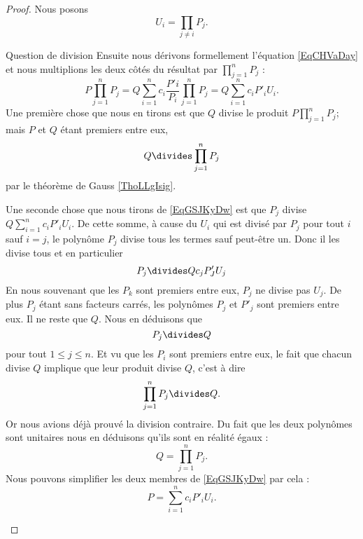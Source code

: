 \begin{proof}
    Nous posons 
    \begin{equation}
        U_i=\prod_{j\neq i}P_j.
    \end{equation}
    \begin{subproof}
    \item[Question de division]
    Ensuite nous dérivons formellement l'équation \eqref{EqCHVaDay} et nous multiplions les deux côtés du résultat par \( \prod_{j=1}^nP_j\) :
    \begin{equation}        \label{EqGSJKyDw}
        P\prod_{j=1}^nP_j=Q\sum_{i=1}^nc_i\frac{ P'i }{ P_i }\prod_{j=1}^nP_j=Q\sum_{i=1}^nc_iP'_iU_i.
    \end{equation}
    Une première chose que nous en tirons est que \( Q\) divise le produit \( P\prod_{j=1}^nP_j\); mais \( P\) et \( Q\) étant premiers entre eux, 
    \begin{equation}
        Q\divides \prod_{j=1}^nP_j
    \end{equation}
    par le théorème de Gauss \ref{ThoLLgIsig}.

    Une seconde chose que nous tirons de \eqref{EqGSJKyDw} est que \( P_j\) divise \( Q\sum_{i=1}^nc_iP'_iU_i\). De cette somme, à cause du \( U_i\) qui est divisé par \( P_j\) pour tout \( i\) sauf \( i=j\), le polynôme \( P_j\) divise tous les termes sauf peut-être un. Donc il les divise tous et en particulier
    \begin{equation}
        P_j\divides Qc_jP'_JU_j
    \end{equation}
    En nous souvenant que les \( P_k\) sont premiers entre eux, \( P_j\) ne divise pas \( U_j\). De plus \( P_j\) étant sans facteurs carrés, les polynômes \( P_j\) et \( P'_j\) sont premiers entre eux. Il ne reste que \( Q\). Nous en déduisons que
    \begin{equation}
        P_j\divides Q
    \end{equation}
    pour tout \( 1\leq j\leq n\). Et vu que les \( P_i\) sont premiers entre eux, le fait que chacun divise \( Q\) implique que leur produit divise \( Q\), c'est à dire
    \begin{equation}
        \prod_{j=1}^nP_j\divides Q.
    \end{equation}
    Or nous avions déjà prouvé la division contraire. Du fait que les deux polynômes sont unitaires nous en déduisons qu'ils sont en réalité égaux :
    \begin{equation}        \label{EqJImORVe}
        Q=\prod_{j=1}^nP_j.
    \end{equation}
    Nous pouvons simplifier les deux membres de \eqref{EqGSJKyDw} par cela :
    \begin{equation}        \label{EqJMtGhGR}
        P=\sum_{i=1}^nc_iP'_iU_i.
    \end{equation}
    

\end{subproof}
\end{proof}
